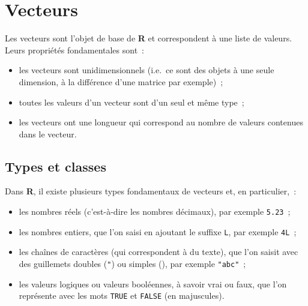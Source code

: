 \documentclass[
  letterpaper,
  DIV=11,
  numbers=noendperiod,
  oneside]{scrreprt}
\providecommand{\tightlist}{%
  \setlength{\itemsep}{0pt}\setlength{\parskip}{0pt}}\usepackage{longtable,booktabs,array}
\begin{document}
\hypertarget{sec-vecteurs}{%
\chapter{Vecteurs}\label{sec-vecteurs}}

Les vecteurs sont l'objet de base de \textbf{R} et correspondent à une
liste de valeurs. Leurs propriétés fondamentales sont~:

\begin{itemize}
\tightlist
\item
  les vecteurs sont unidimensionnels (i.e.~ce sont des objets à une
  seule dimension, à la différence d'une matrice par exemple)~;
\item
  toutes les valeurs d'un vecteur sont d'un seul et même type~;
\item
  les vecteurs ont une longueur qui correspond au nombre de valeurs
  contenues dans le vecteur.
\end{itemize}

\hypertarget{types-et-classes}{%
\section{Types et classes}\label{types-et-classes}}

Dans \textbf{R}, il existe plusieurs types fondamentaux de vecteurs et,
en particulier,~:

\begin{itemize}
\tightlist
\item
  les nombres réels (c'est-à-dire les nombres décimaux),
  par exemple \texttt{5.23}~;
\item
  les nombres entiers, que l'on saisi en ajoutant le suffixe
  \texttt{L}, par exemple \texttt{4L}~;
\item
  les chaînes de caractères (qui correspondent à du texte), que l'on
  saisit avec des guillemets doubles (\texttt{"}) ou simples
  (\texttt{\textquotesingle{}}), par exemple \texttt{"abc"}~;
\item
  les valeurs logiques ou valeurs booléennes, à savoir vrai ou faux, que
  l'on représente avec les mots \texttt{TRUE} et \texttt{FALSE} (en
  majuscules).
\end{itemize}
\end{document}
